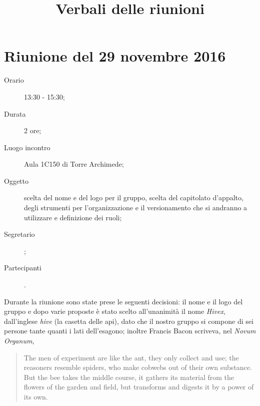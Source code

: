 


\author{\PB}
\supervisor{\GG}
\title{Verbali delle riunioni}



\maketitle
\tableofcontents
\newpage

\section{Riunione del 29 novembre 2016}

\begin{description}
	\item[Orario] 13:30 - 15:30;
	\item[Durata] 2 ore;
	\item[Luogo incontro] Aula 1C150 di Torre Archimede; 
	\item[Oggetto] scelta del nome e del logo per il gruppo, scelta del capitolato d'appalto, degli strumenti per l'organizzazione e il versionamento che si andranno a utilizzare e definizione dei ruoli;
	\item[Segretario] \LB; 
	\item[Partecipanti] \ALL.
\end{description}

Durante la riunione sono state prese le seguenti decisioni:
il nome e il logo del gruppo e dopo varie proposte è stato scelto all'unanimità il nome \emph{Hivex}, dall'inglese \emph{hive} (la casetta delle api), dato che il nostro gruppo si compone di sei persone tante quanti i lati dell'esagono; inoltre Francis Bacon scriveva, nel \emph{Novum Organum},
\begin{quote}
	The men of experiment are like the ant, they only collect and use; the reasoners resemble spiders, who make cobwebs out of their own substance. But the bee takes the middle course, it gathers its material from the flowers of the garden and field, but transforms and digests it by a power of its own.
\end{quote}

